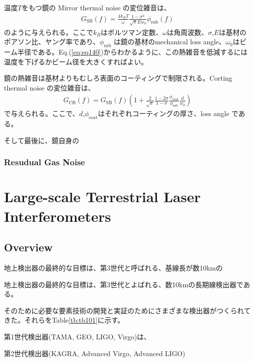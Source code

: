 温度$T$をもつ鏡の Mirror thermal noise の変位雑音は、
\begin{eqnarray}
  G_{\mathrm{SB}}(f)=\frac{4 k_{B} T}{\omega} \frac{1-\sigma^{2}}{\sqrt{\pi} E w_{0}} \phi_{\mathrm{sub}}(f)
  \label{eq:eq140}
\end{eqnarray}
のように与えられる\cite{levin1998internal,numata2003wide}。ここで$k_{B}$はボルツマン定数、$\omega$は角周波数、$\sigma$,$E$は基材のポアソン比、ヤング率であり、$\phi_{\mathrm{sub}}$ は鏡の基材のmechanical loss angle、$\omega_0$はビーム半径である。Eq.(\ref{eq:eq140})からわかるように、この熱雑音を低減するには温度を下げるかビーム径を大きくすればよい。

鏡の熱雑音は基材よりもむしろ表面のコーティングで制限される。Corting thermal noise の変位雑音は、
\begin{eqnarray}
G_{\mathrm{CB}}(f)=G_{\mathrm{SB}}(f)\left(1+\frac{2}{\sqrt{\pi}} \frac{1-2 \sigma}{1-\sigma} \frac{\phi_{\mathrm{coat}}}{\phi_{\mathrm{sub}}} \frac{d}{w_{0}}\right)
\end{eqnarray}
で与えられる\cite{numata2003wide,harry2002thermal}。ここで、$d$,$\phi_{\mathrm{coat}}$はそれぞれコーティングの厚さ、loss angle である。

そして最後に、鏡自身の




\subsubsection{Resudual Gas Noise}


\section{Large-scale Terrestrial Laser Interferometers}
\subsection{Overview}
地上検出器の最終的な目標は、第3世代と呼ばれる、基線長が数10kmの

地上検出器の最終的な目標は、第3世代とよばれる、数10kmの長期線検出器である。

そのために必要な要素技術の開発と実証のためにさまざまな検出器がつくられてきた。それらをTable\ref{tb:tb101}に示す\cite{chen2017brief}。

第1世代検出器(TAMA\cite{ando2001stable}, GEO\cite{grote2010geo}, LIGO\cite{abbott2009ligo}, Virgo\cite{accadia2012virgo})は、

第2世代検出器(KAGRA\cite{akutsu2018kagra}, Advanced Virgo\cite{acernese2014advanced}, Advanced LIGO\cite{aasi2015advanced})


